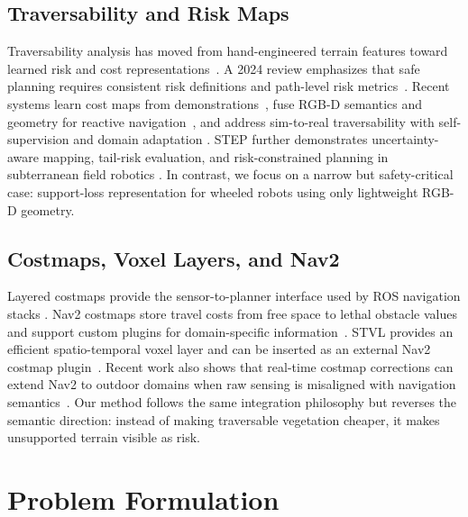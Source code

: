 \documentclass[journal]{IEEEtran}
\begin{document}
\subsection{Traversability and Risk Maps}
Traversability analysis has moved from hand-engineered terrain features toward learned
risk and cost representations~\cite{papadakis2013survey,krusi2017driving,
wellhausen2019where,frey2023fast}. A 2024 review emphasizes that safe planning requires
consistent risk definitions and path-level risk metrics~\cite{benrabah2024review}.
Recent systems learn cost maps from demonstrations~\cite{zhang2024riskcost}, fuse RGB-D
semantics and geometry for reactive navigation~\cite{saucedo2024eat}, and address
sim-to-real traversability with self-supervision and domain adaptation
\cite{vecchio2024traversability}. STEP further demonstrates uncertainty-aware mapping,
tail-risk evaluation, and risk-constrained planning in subterranean field robotics
\cite{step2024}. In contrast, we focus on a narrow but safety-critical case: support-loss
representation for wheeled robots using only lightweight RGB-D geometry.

\subsection{Costmaps, Voxel Layers, and Nav2}
Layered costmaps provide the sensor-to-planner interface used by ROS navigation stacks
\cite{lu2014layered}. Nav2 costmaps store travel costs from free space to lethal obstacle
values and support custom plugins for domain-specific information~\cite{nav2docs2026}.
STVL provides an efficient spatio-temporal voxel layer and can be inserted as an external
Nav2 costmap plugin~\cite{macenski2020stvl,nav2stvl_docs2026}. Recent work also shows that
real-time costmap corrections can extend Nav2 to outdoor domains when raw sensing is
misaligned with navigation semantics~\cite{sani2024nav2costmap}. Our method follows the
same integration philosophy but reverses the semantic direction: instead of making
traversable vegetation cheaper, it makes unsupported terrain visible as risk.

\section{Problem Formulation}
\label{sec:problem}
\end{document}
